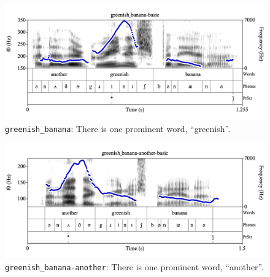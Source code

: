 \documentclass[11pt, twoside]{memoir}
\begin{document}
\begin{figure}[H]
\centering
\includegraphics[width=.875\linewidth]{PrStr-greenish_banana-basic.png}
\caption{\texttt{greenish\_banana}: There is one prominent word, “greenish”.
\label{fig:greenish banana prominent greenish}
}
\end{figure}
\begin{figure}[H]
\centering
\includegraphics[width=.875\linewidth]{PrStr-greenish_banana-another-basic.png}
\caption{\texttt{greenish\_banana-another}: There is one prominent word, “another”.
\label{fig:greenish banana prominent another}
}
\end{figure}
\end{document}

